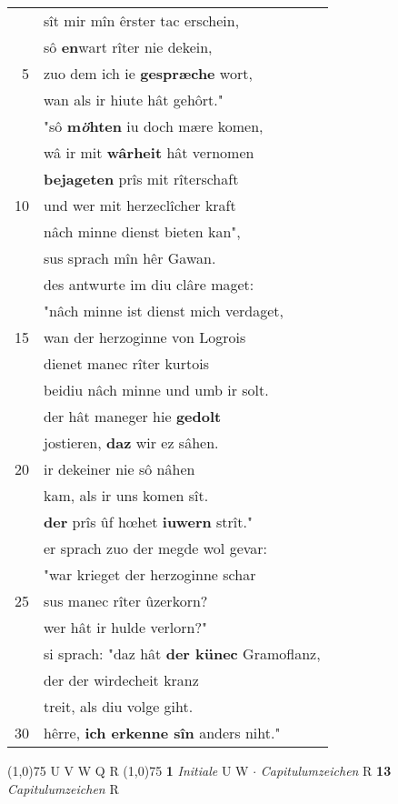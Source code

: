 \documentclass[8pt,a4paper,notitlepage]{article}
\begin{document}
\begin{table}[ht]
\begin{minipage}[t]{0.5\linewidth}
\begin{tabular}{rl}
 & sît mir mîn êrster tac erschein,\\ 
 & sô \textbf{en}wart rîter nie dekein,\\ 
5 & zuo dem ich ie \textbf{gespræche} wort,\\ 
 & wan als ir hiute hât gehôrt."\\ 
 & "sô \textbf{m\textit{ö}hten} iu doch mære komen,\\ 
 & wâ ir mit \textbf{wârheit} hât vernomen\\ 
 & \textbf{bejageten} prîs mit rîterschaft\\ 
10 & und wer mit herzeclîcher kraft\\ 
 & nâch minne dienst bieten kan",\\ 
 & sus sprach mîn hêr Gawan.\\ 
 & des antwurte im diu clâre maget:\\ 
 & "nâch minne ist dienst mich verdaget,\\ 
15 & wan der herzoginne von Logrois\\ 
 & dienet manec rîter kurtois\\ 
 & beidiu nâch minne und umb ir solt.\\ 
 & der hât maneger hie \textbf{gedolt}\\ 
 & jostieren, \textbf{daz} wir ez sâhen.\\ 
20 & ir dekeiner nie sô nâhen\\ 
 & kam, als ir uns komen sît.\\ 
 & \textbf{der} prîs ûf hœhet \textbf{iuwern} strît."\\ 
 & er sprach zuo der megde wol gevar:\\ 
 & "war krieget der herzoginne schar\\ 
25 & sus manec rîter ûzerkorn?\\ 
 & wer hât ir hulde verlorn?"\\ 
 & si sprach: "daz hât \textbf{der künec} Gramoflanz,\\ 
 & der der wirdecheit kranz\\ 
 & treit, als diu volge giht.\\ 
30 & hêrre, \textbf{ich erkenne sîn} anders niht."\\ 
\end{tabular}
\scriptsize
\line(1,0){75} \newline
U V W Q R \newline
\line(1,0){75} \newline
\textbf{1} \textit{Initiale} U W   $\cdot$ \textit{Capitulumzeichen} R  \textbf{13} \textit{Capitulumzeichen} R  \newline

\end{minipage}
\end{table}
\end{document}
